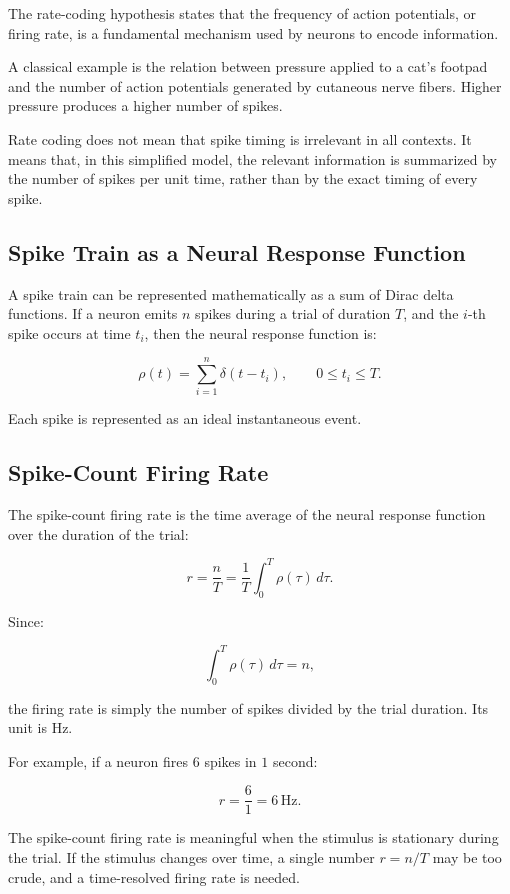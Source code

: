 The rate-coding hypothesis states that the frequency of action potentials, or firing rate, is a fundamental mechanism used by neurons to encode information.

A classical example is the relation between pressure applied to a cat's footpad and the number of action potentials generated by cutaneous nerve fibers. Higher pressure produces a higher number of spikes.

\begin{authornote}
Rate coding does not mean that spike timing is irrelevant in all contexts. It means that, in this simplified model, the relevant information is summarized by the number of spikes per unit time, rather than by the exact timing of every spike.
\end{authornote}

\subsection{Spike Train as a Neural Response Function}

A spike train can be represented mathematically as a sum of Dirac delta functions. If a neuron emits $n$ spikes during a trial of duration $T$, and the $i$-th spike occurs at time $t_i$, then the neural response function is:

\[
\rho(t) =
\sum_{i=1}^{n}
\delta(t - t_i),
\qquad
0 \leq t_i \leq T.
\]

Each spike is represented as an ideal instantaneous event.

\subsection{Spike-Count Firing Rate}

The spike-count firing rate is the time average of the neural response function over the duration of the trial:

\[
r =
\frac{n}{T}
=
\frac{1}{T}
\int_{0}^{T}
\rho(\tau)\,d\tau.
\]

Since:

\[
\int_{0}^{T}
\rho(\tau)\,d\tau
=
n,
\]

the firing rate is simply the number of spikes divided by the trial duration. Its unit is Hz.

For example, if a neuron fires $6$ spikes in $1$ second:

\[
r = \frac{6}{1} = 6\,\text{Hz}.
\]

\begin{authornote}
The spike-count firing rate is meaningful when the stimulus is stationary during the trial. If the stimulus changes over time, a single number $r=n/T$ may be too crude, and a time-resolved firing rate is needed.
\end{authornote}

